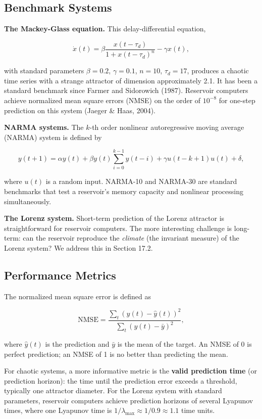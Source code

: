 \subsection{Benchmark Systems}\label{sec:17.1.2}

\textbf{The Mackey-Glass equation.} This delay-differential equation,

\[
\dot{x}(t) = \beta \frac{x(t - \tau_d)}{1 + x(t - \tau_d)^n} - \gamma x(t),
\]

with standard parameters $\beta = 0.2$, $\gamma = 0.1$, $n = 10$, $\tau_d = 17$, produces a chaotic time series with a strange attractor of dimension approximately 2.1. It has been a standard benchmark since Farmer and Sidorowich (1987). Reservoir computers achieve normalized mean square errors (NMSE) on the order of $10^{-8}$ for one-step prediction on this system (Jaeger \& Haas, 2004).

\textbf{NARMA systems.} The $k$-th order nonlinear autoregressive moving average (NARMA) system is defined by

\[
y(t+1) = \alpha y(t) + \beta y(t) \sum_{i=0}^{k-1} y(t-i) + \gamma u(t-k+1) u(t) + \delta,
\]

where $u(t)$ is a random input. NARMA-10 and NARMA-30 are standard benchmarks that test a reservoir's memory capacity and nonlinear processing simultaneously.

\textbf{The Lorenz system.} Short-term prediction of the Lorenz attractor is straightforward for reservoir computers. The more interesting challenge is long-term: can the reservoir reproduce the \textit{climate} (the invariant measure) of the Lorenz system? We address this in Section 17.2.

\subsection{Performance Metrics}\label{sec:17.1.3}

The normalized mean square error is defined as

\[
\text{NMSE} = \frac{\sum_{t} (y(t) - \hat{y}(t))^2}{\sum_{t} (y(t) - \bar{y})^2},
\]

where $\hat{y}(t)$ is the prediction and $\bar{y}$ is the mean of the target. An NMSE of 0 is perfect prediction; an NMSE of 1 is no better than predicting the mean.

For chaotic systems, a more informative metric is the \textbf{valid prediction time} (or prediction horizon): the time until the prediction error exceeds a threshold, typically one attractor diameter. For the Lorenz system with standard parameters, reservoir computers achieve prediction horizons of several Lyapunov times, where one Lyapunov time is $1/\lambda_{\max} \approx 1/0.9 \approx 1.1$ time units.


